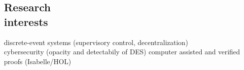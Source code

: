 \documentclass[margin]{res}
\newcommand{\fullhrulefill}{%
  \hspace*{-\sectionwidth}\hrulefill%
  }
\def\theyear{#2#3#4#5}%
\def\themonth{#6#7}%
\def\theday{#8#9}%
\def\thehour{#1#2}%
\def\theminute{#3#4}%
\def\thesecond{#5#6}%
\def\thetimezonehour{+00}%
\def\thetimezoneminute{00}%
\def\thetimezonehour{#1}%
\def\thetimezoneminute{#2}%
\newcommand*{\thetimezone}{\thetimezonehour:\thetimezoneminute}
\begin{document}
\begin{resume}

\fullhrulefill







\section{Research\\interests}
discrete-event systems (supervisory control, decentralization) \\
cybersecurity (opacity and detectabily of DES)
computer assisted and verified proofs (Isabelle/HOL)


\end{resume}
\end{document}
